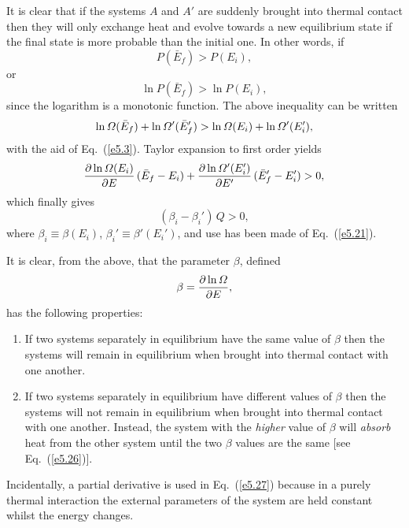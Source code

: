 It is clear that if the systems $A$ and $A'$ are suddenly 
brought into thermal contact  then they will only exchange heat and evolve towards a
new equilibrium state if  the final state is
more probable than the initial one. In other words, if
\begin{equation}
P(\bar{E}_f) > P(E_i),
\end{equation}
or 
\begin{equation}
\ln P(\bar{E}_f)> \ln P(E_i),
\end{equation}
since the logarithm is a monotonic  function. The  above inequality can be written
\begin{equation}
\ln{\mit\Omega}(\bar{E}_f) + \ln{\mit\Omega}'(\bar{E}_f')>\ln{\mit\Omega}(E_i) + \ln{\mit\Omega}'(E_i'), 
\end{equation}
with the aid of Eq.~(\ref{e5.3}). Taylor expansion to first order yields
\begin{equation}
\frac{\partial\ln{\mit\Omega}(E_i)}{\partial E}\, (\bar{E}_f- E_i) +
\frac{\partial\ln{\mit\Omega}'(E_i')}{\partial E'}\,(\bar{E}_f'-E_i') > 0,
\end{equation}
which finally gives
\begin{equation}
(\beta_i - \beta_i')\,Q >0,\label{e5.26}
\end{equation}
where $\beta_i\equiv \beta(E_i)$, $\beta_i'\equiv\beta'(E_i')$,
and use has been made of Eq.~(\ref{e5.21}).

It is clear, from the above, that the parameter $\beta$, defined
\begin{equation}
\beta  =\frac{\partial \ln{\mit\Omega}}{\partial E},\label{e5.27}
\end{equation}
has the following properties:
\begin{enumerate}
\item {\sf If two systems separately in equilibrium have the same value of $\beta$ then
the systems will remain in equilibrium when brought into thermal contact with
one another.}
\item {\sf If two  systems  separately in equilibrium have different values of
 $\beta$ then the systems will not remain
in equilibrium when brought into thermal contact with
one another. Instead, the system with the {\em higher}\/ value of $\beta$
will {\em absorb}\/ heat from the other system until the two $\beta$ values are 
the same [see Eq.~(\ref{e5.26})].}
\end{enumerate}
Incidentally,    a  partial derivative is used  in Eq.~(\ref{e5.27}) 
 because  in a purely thermal interaction the external parameters of the
system are held constant whilst the energy  changes.

